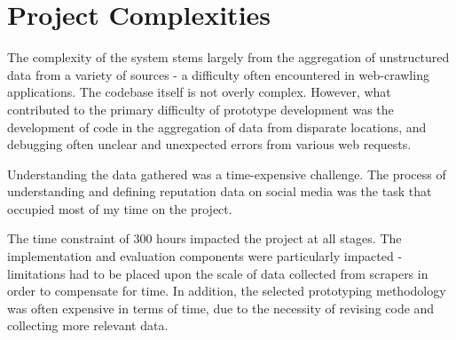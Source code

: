 \section{Project Complexities}

The complexity of the system stems largely from the aggregation of unstructured data from a variety of sources - a difficulty often encountered in web-crawling applications. The codebase itself is not overly complex. However, what contributed to the primary difficulty of prototype development was the development of code in the aggregation of data from disparate locations, and debugging often unclear and unexpected errors from various web requests.

Understanding the data gathered was a time-expensive challenge. The process of understanding and defining reputation data on social media was the task that occupied most of my time on the project. 

The time constraint of 300 hours impacted the project at all stages. The implementation and evaluation components were particularly impacted - limitations had to be placed upon the scale of data collected from scrapers in order to compensate for time. In addition, the selected prototyping methodology was often expensive in terms of time, due to the necessity of revising code and collecting more relevant data.




